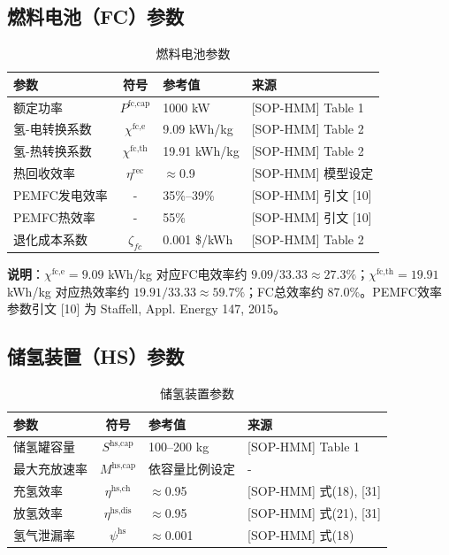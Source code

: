 \documentclass[11pt]{ctexart}
\begin{document}
\subsection{燃料电池（FC）参数}

\begin{table}[htbp]
\centering
\caption{燃料电池参数}
\begin{tabular}{lcll}
\hline
参数 & 符号 & 参考值 & 来源 \\
\hline
额定功率 & $P^{\text{fc,cap}}$ & 1000 kW & {[SOP-HMM]} Table 1 \\
氢-电转换系数 & $\chi^{\text{fc,e}}$ & 9.09 kWh/kg & {[SOP-HMM]} Table 2 \\
氢-热转换系数 & $\chi^{\text{fc,th}}$ & 19.91 kWh/kg & {[SOP-HMM]} Table 2 \\
热回收效率 & $\eta^{\text{rec}}$ & $\approx$0.9 & {[SOP-HMM]} 模型设定 \\
PEMFC发电效率 & - & 35\%--39\% & {[SOP-HMM]} 引文 {[10]} \\
PEMFC热效率 & - & 55\% & {[SOP-HMM]} 引文 {[10]} \\
退化成本系数 & $\zeta_{fc}$ & 0.001 \$/kWh & {[SOP-HMM]} Table 2 \\
\hline
\end{tabular}
\end{table}

\textbf{说明}：$\chi^{\text{fc,e}}=9.09$ kWh/kg 对应FC电效率约 $9.09/33.33 \approx 27.3\%$；$\chi^{\text{fc,th}}=19.91$ kWh/kg 对应热效率约 $19.91/33.33 \approx 59.7\%$；FC总效率约 87.0\%。PEMFC效率参数引文 {[10]} 为 Staffell, Appl. Energy 147, 2015。

\subsection{储氢装置（HS）参数}

\begin{table}[htbp]
\centering
\caption{储氢装置参数}
\begin{tabular}{lcll}
\hline
参数 & 符号 & 参考值 & 来源 \\
\hline
储氢罐容量 & $S^{\text{hs,cap}}$ & 100--200 kg & {[SOP-HMM]} Table 1 \\
最大充放速率 & $M^{\text{hs,cap}}$ & 依容量比例设定 & - \\
充氢效率 & $\eta^{\text{hs,ch}}$ & $\approx$0.95 & {[SOP-HMM]} 式(18), {[31]} \\
放氢效率 & $\eta^{\text{hs,dis}}$ & $\approx$0.95 & {[SOP-HMM]} 式(21), {[31]} \\
氢气泄漏率 & $\psi^{\text{hs}}$ & $\approx$0.001 & {[SOP-HMM]} 式(18) \\
\hline
\end{tabular}
\end{table}
\end{document}
